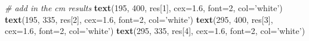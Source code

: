 \documentclass[]{article}
\newenvironment{Shaded}{\begin{snugshade}}{\end{snugshade}}
\newcommand{\CommentTok}[1]{\textcolor[rgb]{0.56,0.35,0.01}{\textit{#1}}}
\newcommand{\DataTypeTok}[1]{\textcolor[rgb]{0.13,0.29,0.53}{#1}}
\newcommand{\DecValTok}[1]{\textcolor[rgb]{0.00,0.00,0.81}{#1}}
\newcommand{\FloatTok}[1]{\textcolor[rgb]{0.00,0.00,0.81}{#1}}
\newcommand{\KeywordTok}[1]{\textcolor[rgb]{0.13,0.29,0.53}{\textbf{#1}}}
\newcommand{\NormalTok}[1]{#1}
\newcommand{\StringTok}[1]{\textcolor[rgb]{0.31,0.60,0.02}{#1}}
\begin{document}
\begin{Shaded}
\begin{Highlighting}[]
  \CommentTok{# add in the cm results}
  \KeywordTok{text}\NormalTok{(}\DecValTok{195}\NormalTok{, }\DecValTok{400}\NormalTok{, res[}\DecValTok{1}\NormalTok{], }\DataTypeTok{cex=}\FloatTok{1.6}\NormalTok{, }\DataTypeTok{font=}\DecValTok{2}\NormalTok{, }\DataTypeTok{col=}\StringTok{'white'}\NormalTok{)}
  \KeywordTok{text}\NormalTok{(}\DecValTok{195}\NormalTok{, }\DecValTok{335}\NormalTok{, res[}\DecValTok{2}\NormalTok{], }\DataTypeTok{cex=}\FloatTok{1.6}\NormalTok{, }\DataTypeTok{font=}\DecValTok{2}\NormalTok{, }\DataTypeTok{col=}\StringTok{'white'}\NormalTok{)}
  \KeywordTok{text}\NormalTok{(}\DecValTok{295}\NormalTok{, }\DecValTok{400}\NormalTok{, res[}\DecValTok{3}\NormalTok{], }\DataTypeTok{cex=}\FloatTok{1.6}\NormalTok{, }\DataTypeTok{font=}\DecValTok{2}\NormalTok{, }\DataTypeTok{col=}\StringTok{'white'}\NormalTok{)}
  \KeywordTok{text}\NormalTok{(}\DecValTok{295}\NormalTok{, }\DecValTok{335}\NormalTok{, res[}\DecValTok{4}\NormalTok{], }\DataTypeTok{cex=}\FloatTok{1.6}\NormalTok{, }\DataTypeTok{font=}\DecValTok{2}\NormalTok{, }\DataTypeTok{col=}\StringTok{'white'}\NormalTok{)}


\end{Highlighting}
\end{Shaded}
\end{document}
